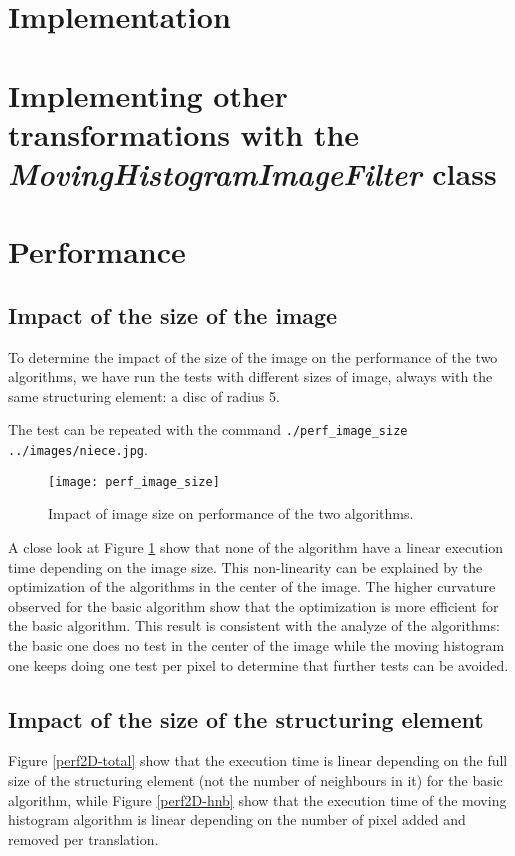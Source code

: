 \documentclass{InsightArticle}
\begin{document}
\section{Implementation}

\section{Implementing other transformations with the {\em MovingHistogramImageFilter} class}

\section{Performance}

  \subsection{Impact of the size of the image}

To determine the impact of the size of the image on the performance of the two
algorithms, we have run the tests with different sizes of image, always with
the same structuring element: a disc of radius 5.

The test can be repeated with the command
\verb$./perf_image_size ../images/niece.jpg$.

\begin{figure}[htbp]
\centering
\texttt{[image: perf\_image\_size]}
\caption{Impact of image size on performance of the two algorithms.\label{perf_image_size}}
\end{figure}

A close look at Figure \ref{perf_image_size} show that none of the algorithm
have a linear execution time depending on the image size. This non-linearity can
be explained by the optimization of the algorithms in the center of the
image. The higher curvature observed for the basic algorithm show that the
optimization is more efficient for the basic algorithm. This result is
consistent with the analyze of the algorithms: the basic one does no test in the
center of the image while the moving histogram one keeps doing one test per
pixel to determine that further tests can be avoided.

  \subsection{Impact of the size of the structuring element}

Figure \ref{perf2D-total} show that the execution time is linear depending on
the full size of the structuring element (not the number of neighbours in it)
for the basic algorithm, while Figure \ref{perf2D-hnb} show that the execution
time of the moving histogram algorithm is linear depending on the number of
pixel added and removed per translation.
\end{document}
